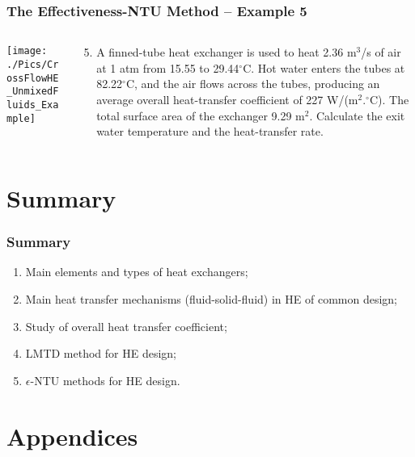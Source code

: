 \documentclass[10pt,compress,handout,ignorenonframetext,unknownkeysallowed]{beamer}
\begin{document}
\begin{frame}
  \frametitle{ The Effectiveness-NTU Method -- Example 5}
    \begin{columns}
       \begin{column}[l]{0.58\linewidth}
         \texttt{[image: ./Pics/CrossFlowHE\_UnmixedFluids\_Example]}
       \end{column}
       \begin{column}[l]{0.42\linewidth}
          \begin{enumerate}\setcounter{enumi}{4}
              \item A finned-tube heat exchanger is used to heat 2.36 m$^{3}$/s of air at 1 atm from 15.55 to 29.44$^{\circ}$C. Hot water enters the tubes at 82.22$^{\circ}$C, and the air flows across the tubes, producing an average overall heat-transfer coefficient of 227 W/(m$^{2}$.$^{\circ}$C). The total surface area of the exchanger 9.29 m$^{2}$. Calculate the exit water temperature and the heat-transfer rate.
          \end{enumerate}
       \end{column}      
    \end{columns}
\end{frame}



\section{Summary}


\begin{frame}
  \frametitle{Summary}
    \begin{enumerate}
       \item Main elements and types of heat exchangers;
       \item Main heat transfer mechanisms (fluid-solid-fluid) in HE of common design;
       \item Study of overall heat transfer coefficient;
       \item LMTD method for HE design;
       \item $\epsilon$-NTU methods for HE design.
    \end{enumerate}
\end{frame}








\section{Appendices}
\end{document}
